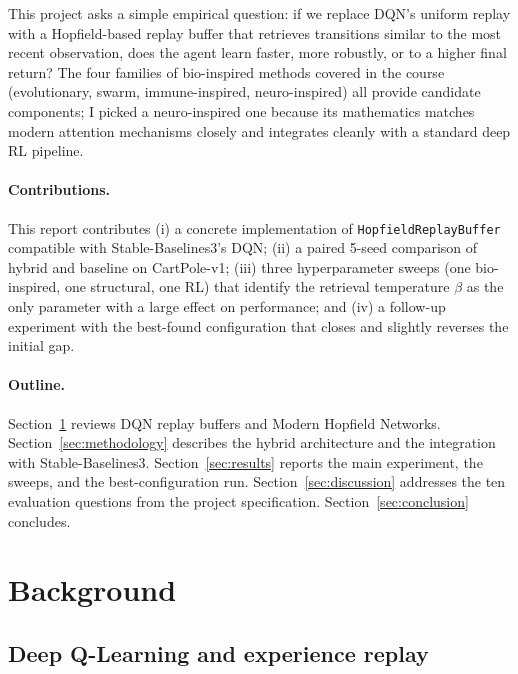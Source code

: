 \documentclass[a4paper,11pt]{article}
\begin{document}
This project asks a simple empirical question: if we replace DQN's uniform
replay with a Hopfield-based replay buffer that retrieves transitions
similar to the most recent observation, does the agent learn faster, more
robustly, or to a higher final return? The four families of bio-inspired
methods covered in the course (evolutionary, swarm, immune-inspired,
neuro-inspired) all provide candidate components; I picked a neuro-inspired
one because its mathematics matches modern attention mechanisms closely
and integrates cleanly with a standard deep RL pipeline.

\paragraph{Contributions.}
This report contributes (i) a concrete implementation of
\texttt{HopfieldReplayBuffer} compatible with Stable-Baselines3's DQN;
(ii) a paired 5-seed comparison of hybrid and baseline on CartPole-v1;
(iii) three hyperparameter sweeps (one bio-inspired, one structural, one
RL) that identify the retrieval temperature $\beta$ as the only parameter
with a large effect on performance; and (iv) a follow-up experiment with
the best-found configuration that closes and slightly reverses the initial
gap.

\paragraph{Outline.}
Section~\ref{sec:background} reviews DQN replay buffers and Modern
Hopfield Networks. Section~\ref{sec:methodology} describes the hybrid
architecture and the integration with Stable-Baselines3.
Section~\ref{sec:results} reports the main experiment, the sweeps, and the
best-configuration run. Section~\ref{sec:discussion} addresses the ten
evaluation questions from the project specification.
Section~\ref{sec:conclusion} concludes.

\section{Background}
\label{sec:background}

\subsection{Deep Q-Learning and experience replay}
\end{document}
